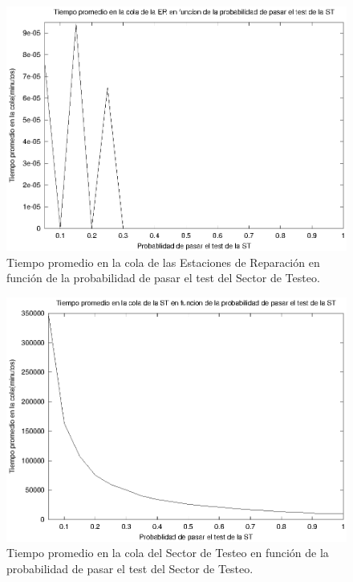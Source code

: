 \documentclass[a4paper,10pt]{article}
\begin{document}
\begin{figure}[ht]
\begin{center}
\includegraphics[width=15cm]{./img/tp_ER.eps}
\caption{\label{fig:tp_ER} Tiempo promedio en la cola de las Estaciones de Reparaci\'on en funci\'on de la probabilidad de pasar el test del Sector de Testeo.}
\end{center}
\end{figure}

\begin{figure}[ht]
\begin{center}
\includegraphics[width=15cm]{./img/tp_ST.eps}
\caption{\label{fig:tp_ST} Tiempo promedio en la cola del Sector de Testeo en funci\'on de la probabilidad de pasar el test del Sector de Testeo.}
\end{center}
\end{figure}
\end{document}
